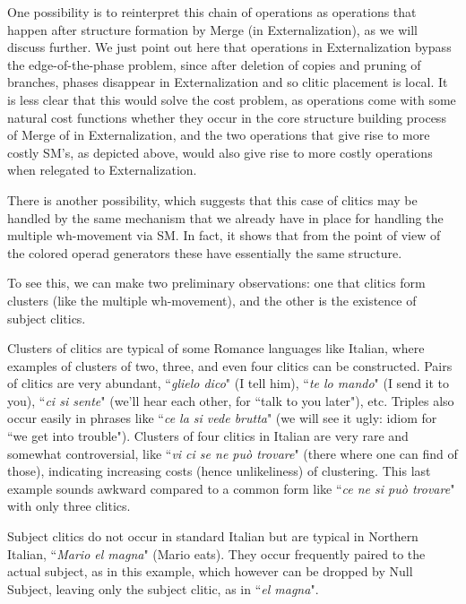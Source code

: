 \documentclass[12pt]{amsart}
\numberwithin{equation}{section}
\begin{document}
\smallskip

One possibility is to reinterpret this chain of operations as operations that
happen after structure formation by Merge (in Externalization), as  we will 
discuss further. We just point out here that operations in Externalization 
bypass the edge-of-the-phase problem, since after deletion 
of copies and pruning of branches, phases disappear in Externalization 
and so clitic placement is local. It is
less clear that this would solve the cost problem, as operations come
with some natural cost functions whether they occur in the core structure
building process of Merge of in Externalization, and the two operations that
give rise to more costly SM's, as depicted above, would also give rise to 
more costly operations when relegated to Externalization. 

\smallskip

There is another possibility, which suggests that this case of clitics may be
handled by the same mechanism that we already have in place for
handling the multiple wh-movement via SM. In fact, it shows that from
the point of view of the colored operad generators these have essentially
the same structure.

\smallskip

To see this, we can make two preliminary observations: one that clitics
form clusters (like the multiple wh-movement), and the other is the
existence of subject clitics.

Clusters of clitics are typical of some Romance languages like Italian, where examples of clusters
of two, three, and even four clitics can be constructed. Pairs of clitics
are very abundant, ``{\em glielo dico}" (I tell him), ``{\em te lo mando}" (I send it to you), ``{\em ci si sente}" 
(we'll hear each other, for ``talk to you later"), etc. Triples
also occur easily in phrases like ``{\em ce la si vede brutta}" (we will see it ugly: idiom for ``we get into trouble"). 
Clusters of four clitics in Italian are very rare and somewhat controversial, like 
``{\em vi ci se ne pu\`o trovare}" (there where one can find of those), indicating increasing 
costs (hence unlikeliness) of clustering. This last example sounds awkward 
compared to a common form like  ``{\em ce ne si pu\`o trovare}" with only three clitics. 

Subject clitics do not occur in standard Italian but are typical in Northern Italian,
``{\em Mario el magna}" (Mario eats). They occur frequently paired to the actual
subject, as in this example, which however can be dropped by Null Subject, leaving 
only the subject clitic, as in  ``{\em el magna}".
\end{document}
